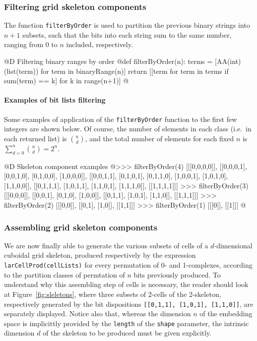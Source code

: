 \documentclass[11pt,oneside]{article}	%
\begin{document}
\subsubsection{Filtering grid skeleton components}
\label{sec:filterByOrder}

The function \texttt{filterByOrder} is used to partition the previous binary strings into $n+1$ subsets, such that the bits into each string sum to the same number, ranging from 0 to $n$ included, respectively.

@D Filtering binary ranges by order
@{def filterByOrder(n):
    terms = [AA(int)(list(term)) for term in binaryRange(n)]
    return [[term for term in terms if sum(term) == k] for k in range(n+1)]
@}

\paragraph{Examples of bit lists filtering}
Some examples of application of the \texttt{filterByOrder} function to the first few integers are shown below.
Of course, the number of elements in each class (i.e.~in each returned list) is ${n \choose d}$, and the total number of elements for each fixed $n$ is $\sum_{d=0}^n {n \choose d} = 2^n$.

@D Skeleton component examples 
@{>>> filterByOrder(4)
[[[0,0,0,0]],
 [[0,0,0,1], [0,0,1,0], [0,1,0,0], [1,0,0,0]],
 [[0,0,1,1], [0,1,0,1], [0,1,1,0], [1,0,0,1], [1,0,1,0], [1,1,0,0]],
 [[0,1,1,1], [1,0,1,1], [1,1,0,1], [1,1,1,0]],
 [[1,1,1,1]]]
>>> filterByOrder(3)
[[[0,0,0]],
 [[0,0,1], [0,1,0], [1,0,0]],
 [[0,1,1], [1,0,1], [1,1,0]],
 [[1,1,1]]]
>>> filterByOrder(2)
[[[0,0]], [[0,1], [1,0]], [[1,1]]]
>>> filterByOrder(1)
[[[0]], [[1]]]
@}


\subsubsection{Assembling grid skeleton components}
\label{sec:assembly}

We are now finally able to generate the various subsets of cells of a $d$-dimensional cuboidal grid skeleton, produced respectively by the expression \texttt{larCellProd(cellLists)} for every permutation of 0- and 1-complexes, according to the partition classes of permtation of $n$ bits previously produced. To understand why this assembling step of cells is necessary, the reader should look at Figure~\ref{fig:sleletons}, where three subsets of 2-cells of the 2-skeleton, respectively generated by the bit dispositions \texttt{[[0,1,1], [1,0,1], [1,1,0]]}, are separately displayed.
Notice also that, whereas the dimension $n$ of the embedding space is implicittly provided by the \texttt{length} of the \texttt{shape} parameter, the intrinsic dimension $d$ of the skeleton to be produced must be given explicitly.
\end{document}
